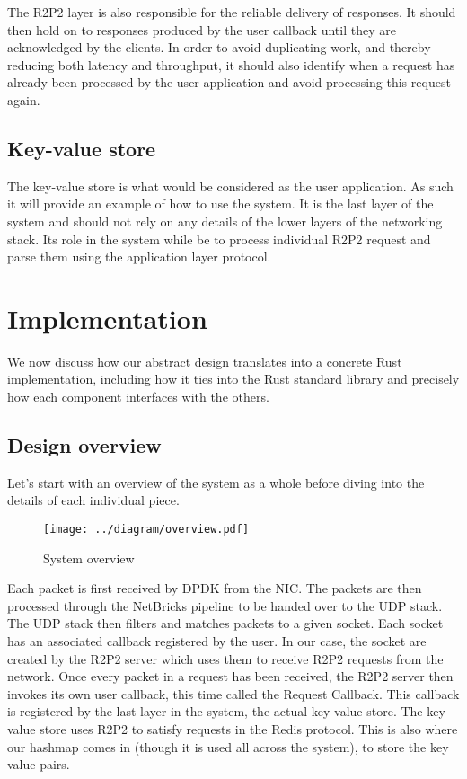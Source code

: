 \documentclass[11pt]{book}
\begin{document}
The R2P2 layer is also responsible for the reliable delivery of
responses. It should then hold on to responses produced by the user
callback until they are acknowledged by the clients. In order to avoid
duplicating work, and thereby reducing both latency and throughput,
it should also identify when a request has already been processed by
the user application and avoid processing this request again.

\section{Key-value store}

The key-value store is what would be considered as the user
application. As such it will provide an example of how to use the
system. It is the last layer of the system and should not rely on any
details of the lower layers of the networking stack. Its role in the
system while be to process individual R2P2 request and parse them
using the application layer protocol.

\chapter{Implementation}

We now discuss how our abstract design translates into a concrete Rust
implementation, including how it ties into the Rust standard library
and precisely how each component interfaces with the others.

\section{Design overview}

Let's start with an overview of the system as a whole before diving
into the details of each individual piece.

\begin{figure}[htb!]
  \texttt{[image: ../diagram/overview.pdf]}
  \caption{System overview}
  \label{fig:design-overview}
\end{figure}

Each packet is first received by DPDK from the NIC\@. The packets are
then processed through the NetBricks pipeline to be handed over to the
UDP stack. The UDP stack then filters and matches packets to a given
socket. Each socket has an associated callback registered by the
user. In our case, the socket are created by the R2P2 server which
uses them to receive R2P2 requests from the network. Once every packet
in a request has been received, the R2P2 server then invokes its own
user callback, this time called the Request Callback. This callback
is registered by the last layer in the system, the actual key-value
store. The key-value store uses R2P2 to satisfy requests in the Redis
protocol. This is also where our hashmap comes in (though it is used
all across the system), to store the key value pairs.
\end{document}

